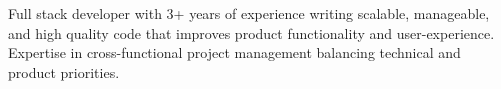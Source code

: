 

\begin{cvparagraph}

Full stack developer with 3+ years of experience writing scalable, manageable, and high quality code that improves product functionality and user-experience.  Expertise in cross-functional project management balancing technical and product priorities.  
\end{cvparagraph}

